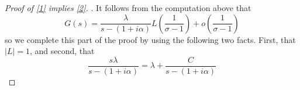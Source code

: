 \documentclass[10pt,a4paper]{amsart}
\newcommand{\NN}{{\mathcal N}}
\begin{document}
\begin{proof}[Proof of \eqref{1} implies \eqref{2}]
 . It follows from the computation above that
 \[
  G(s)=\frac{\lambda}{s-(1+i\alpha)} L\left(\frac{1}{\sigma-1}\right) +o\left(\frac{1}{\sigma-1}\right)
 \]
 so we complete this part of the proof by using the following two facts. First, that $|L|=1$, and second, that
 \[
 \frac{s\lambda}{s-(1+i\alpha)} = \lambda+\frac{C}{s-(1+i\alpha)}
 \]
\fi
  \end{proof}
\end{document}

